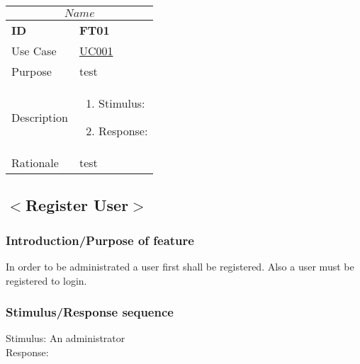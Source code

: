     \begin{tabular}{ |p{2cm}||p{11cm}| }
        \hline
        \multicolumn{2}{|c|}{$$Name$$} \\ \hline
        \textbf{ID} & \textbf{FT01} \\ \hline
        Use Case & \underline{UC001} \\ \hline
        Purpose & test \\ \hline
        Description &
        \begin{enumerate}
            \item Stimulus: 
            \item Response: 
        \end{enumerate}
        \\ \hline 
        Rationale & test \\ \hline
    \end{tabular}


    \subsection{$<$Register User$>$}
        \subsubsection{Introduction/Purpose of feature}
        In order to be administrated a user first shall be registered. Also a user must be registered to login. 
        \subsubsection{Stimulus/Response sequence}
        \begin{description}
            \item[Stimulus: An administrator ]
            \item[Response:]
        \end{description}
